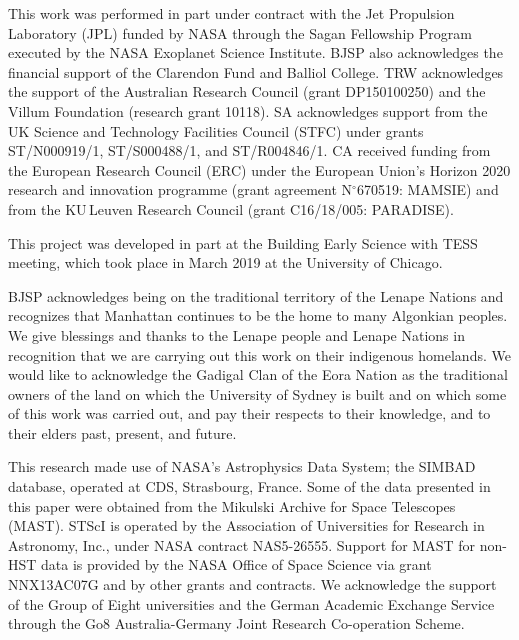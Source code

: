 \documentclass[modern]{aastex62}
\begin{document}
This work was performed in part under contract with the Jet Propulsion Laboratory (JPL) funded by NASA through the Sagan Fellowship Program executed by the NASA Exoplanet Science Institute. BJSP also acknowledges the financial support of the Clarendon Fund and Balliol College. TRW acknowledges the support of the Australian Research Council (grant DP150100250) and the Villum Foundation (research grant 10118). SA acknowledges support from the UK Science and Technology Facilities Council (STFC) under grants ST/N000919/1, ST/S000488/1, and ST/R004846/1. CA received funding from the European Research Council (ERC) under the European Union’s Horizon 2020 research and innovation programme (grant agreement N$^\circ$670519: MAMSIE) and from the KU\,Leuven Research Council (grant C16/18/005: PARADISE).

This project was developed in part at the Building Early Science with TESS meeting, which took place in March 2019 at the University of Chicago.

BJSP acknowledges being on the traditional territory of the Lenape Nations and recognizes that Manhattan continues to be the home to many Algonkian peoples. We give blessings and thanks to the Lenape people and Lenape Nations in recognition that we are carrying out this work on their indigenous homelands. We would like to acknowledge the Gadigal Clan of the Eora Nation as the traditional owners of the land on which the University of Sydney is built and on which some of this work was carried out, and pay their respects to their knowledge, and to their elders past, present, and future.
%

This research made use of NASA's Astrophysics Data System; the SIMBAD database, operated at CDS, Strasbourg, France. Some of the data presented in this paper were obtained from the Mikulski Archive for Space Telescopes (MAST). STScI is operated by the Association of Universities for Research in Astronomy, Inc., under NASA contract NAS5-26555. Support for MAST for non-HST data is provided by the NASA Office of Space Science via grant NNX13AC07G and by other grants and contracts. We acknowledge the support of the Group of Eight universities and the German Academic Exchange Service through the Go8 Australia-Germany Joint Research Co-operation Scheme. 

\end{document}
